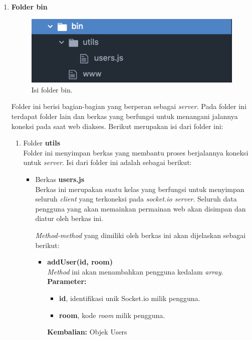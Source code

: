 \begin{enumerate}
	\item \textbf{Folder bin} \\
	
	\begin{figure}[H]
		\centering
		\includegraphics[scale=0.4]{Gambar/direktori_bin}
		\caption{Isi folder bin.}
		\label{fig:direktori_bin}
	\end{figure}
	
	Folder ini berisi bagian-bagian yang berperan sebagai \textit{server}. Pada folder ini terdapat folder lain dan berkas yang berfungsi untuk menangani jalannya koneksi pada saat web diakses. Berikut merupakan isi dari folder ini:
	\begin{enumerate}
		\item Folder \textbf{utils} \\
		Folder ini menyimpan berkas yang membantu proses berjalannya koneksi untuk \textit{server}. Isi dari folder ini adalah sebagai berikut:
		\begin{itemize}
			\item Berkas \textbf{users.js}  \\
			Berkas ini merupakan suatu kelas yang berfungsi untuk menyimpan seluruh \textit{client} yang terkoneksi pada \textit{socket.io server}. Seluruh data pengguna yang akan memainkan permainan web akan disimpan dan diatur oleh berkas ini.
			
			\textit{Method-method} yang dimiliki oleh berkas ini akan dijelaskan sebagai berikut:
			\begin{itemize}
				\item \textbf{addUser(id, room)} \\
				\textit{Method} ini akan menambahkan pengguna kedalam \textit{array}. \\
				\textbf{Parameter:}
				\begin{itemize}
					\item \textbf{id}, identifikasi unik Socket.io milik pengguna.
					\item \textbf{room}, kode \textit{room} milik pengguna.
				\end{itemize}
				\textbf{Kembalian:} Objek Users
				

\end{itemize}
\end{itemize}
\end{enumerate}
\end{enumerate}
